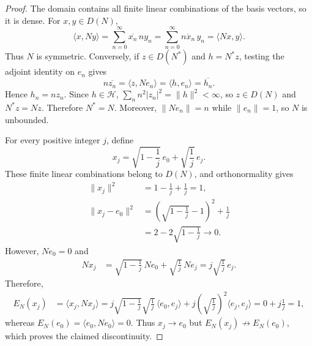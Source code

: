 \documentclass{techbrief}
\begin{document}
\begin{proof}
	The domain contains all finite linear combinations of the
	basis vectors, so it is dense. For $x,y\in D(N)$,
	\begin{equation*}
		\langle x,Ny\rangle
		=\sum_{n=0}^{\infty}\overline{x_n}\,ny_n
		=\sum_{n=0}^{\infty}\overline{nx_n}\,y_n
		=\langle Nx,y\rangle.
	\end{equation*}
	Thus $N$ is symmetric. Conversely, if $z\in D(N^*)$ and
	$h=N^*z$, testing the adjoint identity on $e_n$ gives
	\begin{equation*}
		n\overline{z_n}
		=\langle z,Ne_n\rangle
		=\langle h,e_n\rangle
		=\overline{h_n}.
	\end{equation*}
	Hence $h_n=nz_n$. Since $h\in\mathcal{H}$,
	$\sum_n n^2|z_n|^2=\|h\|^2<\infty$, so $z\in D(N)$
	and $N^*z=Nz$. Therefore $N^*=N$. Moreover,
	$\|Ne_n\|=n$ while $\|e_n\|=1$, so $N$ is unbounded.
	
	For every positive integer $j$, define
	\begin{equation*}
		x_j=\sqrt{1-\frac{1}{j}}\,e_0
		+\sqrt{\frac{1}{j}}\,e_j.
	\end{equation*}
	These finite linear combinations belong to $D(N)$, and
	orthonormality gives
	\begin{equation*}
		\begin{aligned}
			\|x_j\|^2
			&=1-\frac{1}{j}+\frac{1}{j}=1,\\
			\|x_j-e_0\|^2
			&=\left(\sqrt{1-\frac{1}{j}}-1\right)^2+\frac{1}{j}\\
			&=2-2\sqrt{1-\frac{1}{j}}\longrightarrow0.
		\end{aligned}
	\end{equation*}
	However, $Ne_0=0$ and
	\begin{equation*}
		\begin{aligned}
			Nx_j
			&=\sqrt{1-\frac{1}{j}}\,Ne_0
			+\sqrt{\frac{1}{j}}\,Ne_j=j\sqrt{\frac{1}{j}}\,e_j.
		\end{aligned}
	\end{equation*}
	Therefore,
	\begin{equation*}
		\begin{aligned}
			E_N(x_j)
			&=\langle x_j,Nx_j\rangle=j\sqrt{1-\frac{1}{j}}\sqrt{\frac{1}{j}}\,
			\langle e_0,e_j\rangle
			+j\left(\sqrt{\frac{1}{j}}\right)^2
			\langle e_j,e_j\rangle=0+j\frac{1}{j}=1,
		\end{aligned}
	\end{equation*}
	whereas $E_N(e_0)=\langle e_0,Ne_0\rangle=0$.
	Thus $x_j\to e_0$ but $E_N(x_j)\not\to E_N(e_0)$,
	which proves the claimed discontinuity.
\end{proof}
\end{document}
